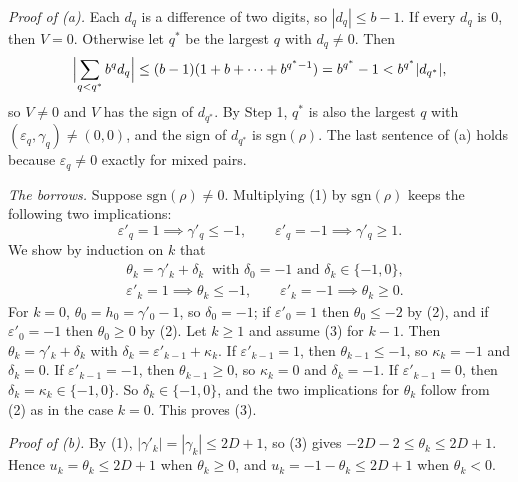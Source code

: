 \documentclass[11pt,letterpaper]{article}
\theoremstyle{paperstyle}
\theoremstyle{paperstyledef}
\theoremstyle{paperstylerem}
\begin{document}
\emph{Proof of (a).} Each \(d_q\) is a difference of two digits, so \(|d_q| \le b - 1\). If every \(d_q\) is \(0\), then \(V = 0\). Otherwise let \(q^*\) be the largest \(q\) with \(d_q \ne 0\). Then \[\Bigl|\sum_{q < q^*} b^q d_q\Bigr| \le (b-1)(1 + b + \dots + b^{q^*-1}) = b^{q^*} - 1 < b^{q^*} |d_{q^*}|,\] so \(V \ne 0\) and \(V\) has the sign of \(d_{q^*}\). By Step 1, \(q^*\) is also the largest \(q\) with \((\varepsilon_q, \gamma_q) \ne (0,0)\), and the sign of \(d_{q^*}\) is \(\mathrm{sgn}(\rho)\). The last sentence of (a) holds because \(\varepsilon_q \ne 0\) exactly for mixed pairs.

\emph{The borrows.} Suppose \(\mathrm{sgn}(\rho) \ne 0\). Multiplying (1) by \(\mathrm{sgn}(\rho)\) keeps the following two implications: \[\varepsilon'_q = 1 \implies \gamma'_q \le -1, \qquad \varepsilon'_q = -1 \implies \gamma'_q \ge 1. \tag{2}\] We show by induction on \(k\) that \[\begin{aligned}
&\theta_k = \gamma'_k + \delta_k \ \text{ with } \delta_0 = -1 \text{ and } \delta_k \in \{-1, 0\}, \\
&\varepsilon'_k = 1 \implies \theta_k \le -1, \qquad \varepsilon'_k = -1 \implies \theta_k \ge 0.
\end{aligned} \tag{3}\] For \(k = 0\), \(\theta_0 = h_0 = \gamma'_0 - 1\), so \(\delta_0 = -1\); if \(\varepsilon'_0 = 1\) then \(\theta_0 \le -2\) by (2), and if \(\varepsilon'_0 = -1\) then \(\theta_0 \ge 0\) by (2). Let \(k \ge 1\) and assume (3) for \(k - 1\). Then \(\theta_k = \gamma'_k + \delta_k\) with \(\delta_k = \varepsilon'_{k-1} + \kappa_k\). If \(\varepsilon'_{k-1} = 1\), then \(\theta_{k-1} \le -1\), so \(\kappa_k = -1\) and \(\delta_k = 0\). If \(\varepsilon'_{k-1} = -1\), then \(\theta_{k-1} \ge 0\), so \(\kappa_k = 0\) and \(\delta_k = -1\). If \(\varepsilon'_{k-1} = 0\), then \(\delta_k = \kappa_k \in \{-1, 0\}\). So \(\delta_k \in \{-1, 0\}\), and the two implications for \(\theta_k\) follow from (2) as in the case \(k = 0\). This proves (3).

\emph{Proof of (b).} By (1), \(|\gamma'_k| = |\gamma_k| \le 2D + 1\), so (3) gives \(-2D - 2 \le \theta_k \le 2D + 1\). Hence \(u_k = \theta_k \le 2D+1\) when \(\theta_k \ge 0\), and \(u_k = -1 - \theta_k \le 2D+1\) when \(\theta_k < 0\).
\end{document}
